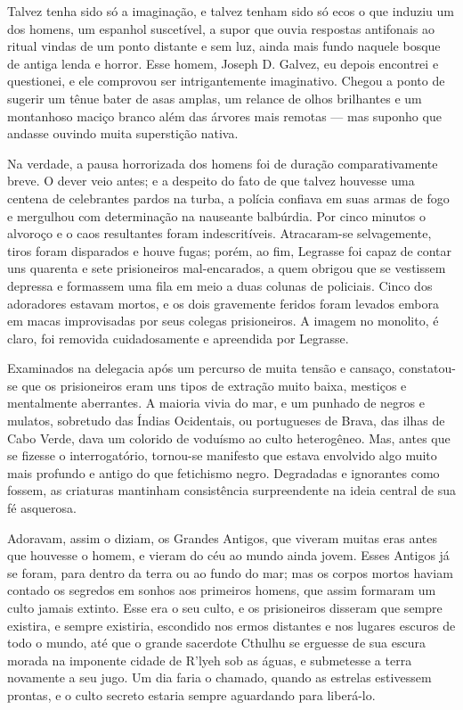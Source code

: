 Talvez tenha sido só a imaginação, e talvez tenham sido só ecos o que
induziu um dos homens, um espanhol suscetível, a supor que ouvia
respostas antifonais ao ritual vindas de um ponto distante e sem luz,
ainda mais fundo naquele bosque de antiga lenda e horror. Esse homem,
Joseph D. Galvez, eu depois encontrei e questionei, e ele comprovou ser
intrigantemente imaginativo. Chegou a ponto de sugerir um tênue bater
de asas amplas, um relance de olhos brilhantes e um montanhoso maciço
branco além das árvores mais remotas --- mas suponho que andasse ouvindo
muita superstição nativa.

Na verdade, a pausa horrorizada dos homens foi de duração
comparativamente breve. O dever veio antes; e a despeito do fato de que
talvez houvesse uma centena de celebrantes pardos na turba, a polícia
confiava em suas armas de fogo e mergulhou com determinação na nauseante
balbúrdia. Por cinco minutos o alvoroço e o caos resultantes foram
indescritíveis. Atracaram-se selvagemente, tiros foram disparados e
houve fugas; porém, ao fim, Legrasse foi capaz de contar uns
quarenta e sete prisioneiros mal-encarados, a quem obrigou que se
vestissem depressa e formassem uma fila em meio a duas colunas de
policiais. Cinco dos adoradores estavam mortos, e os dois gravemente
feridos foram levados embora em macas improvisadas por seus colegas
prisioneiros. A imagem no monolito, é claro, foi removida cuidadosamente
e apreendida por Legrasse.

Examinados na delegacia após um percurso de muita tensão e cansaço,
constatou-se que os prisioneiros eram uns tipos de extração muito baixa,
mestiços e mentalmente aberrantes. A maioria vivia do mar, e um punhado
de negros e mulatos, sobretudo das Índias Ocidentais, ou portugueses de
Brava, das ilhas de Cabo Verde, dava um colorido de voduísmo ao culto
heterogêneo. Mas, antes que se fizesse o interrogatório, tornou-se
manifesto que estava envolvido algo muito mais profundo e antigo 
do que fetichismo negro. Degradadas e ignorantes como fossem, as criaturas
mantinham consistência surpreendente na ideia central de sua fé
asquerosa.

Adoravam, assim o diziam, os Grandes Antigos, que viveram muitas eras
antes que houvesse o homem, e vieram do céu ao mundo ainda jovem.
Esses Antigos já se foram, para dentro da terra ou ao fundo do mar; mas
os corpos mortos haviam contado os segredos em sonhos aos primeiros
homens, que assim formaram um culto jamais extinto. Esse era o seu
culto, e os prisioneiros disseram que sempre existira, e sempre
existiria, escondido nos ermos distantes e nos lugares escuros de todo o
mundo, até que o grande sacerdote Cthulhu se erguesse de sua escura
morada na imponente cidade de R'lyeh sob as águas, e submetesse a terra
novamente a seu jugo. Um dia faria o chamado, quando as estrelas
estivessem prontas, e o culto secreto estaria sempre aguardando para
liberá-lo.

